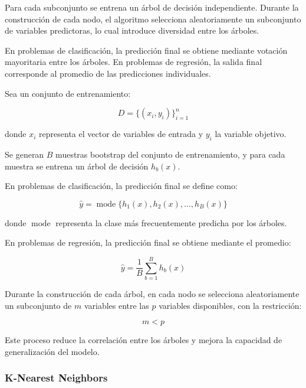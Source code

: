 Para cada subconjunto se entrena un árbol de decisión independiente. Durante la construcción de cada nodo, el algoritmo selecciona aleatoriamente un subconjunto de variables predictoras, lo cual introduce diversidad entre los árboles.

En problemas de clasificación, la predicción final se obtiene mediante votación mayoritaria entre los árboles. En problemas de regresión, la salida final corresponde al promedio de las predicciones individuales.


Sea un conjunto de entrenamiento:

\begin{equation}
	D = \{(x_i, y_i)\}_{i=1}^{n}
\end{equation}

donde $x_i$ representa el vector de variables de entrada y $y_i$ la variable objetivo.

Se generan $B$ muestras bootstrap del conjunto de entrenamiento, y para cada muestra se entrena un árbol de decisión $h_b(x)$.

En problemas de clasificación, la predicción final se define como:

\begin{equation}
	\hat{y} = \operatorname{mode}\{h_1(x), h_2(x), \dots, h_B(x)\}
\end{equation}

donde $\operatorname{mode}$ representa la clase más frecuentemente predicha por los árboles.

En problemas de regresión, la predicción final se obtiene mediante el promedio:

\begin{equation}
	\hat{y} = \frac{1}{B}\sum_{b=1}^{B} h_b(x)
\end{equation}

Durante la construcción de cada árbol, en cada nodo se selecciona aleatoriamente un subconjunto de $m$ variables entre las $p$ variables disponibles, con la restricción:

\begin{equation}
	m < p
\end{equation}

Este proceso reduce la correlación entre los árboles y mejora la capacidad de generalización del modelo.

\subsubsection{K-Nearest Neighbors}

